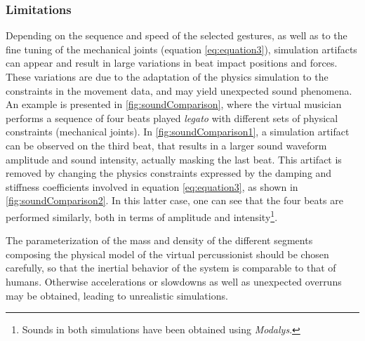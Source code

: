			\subsubsection{Limitations}
			\label{subsubsec:AL_IGS_L}

Depending on the sequence and speed of the selected gestures, as well as to the fine tuning of the mechanical joints (equation \ref{eq:equation3}), simulation artifacts can appear and result in large variations in beat impact positions and forces. These variations are due to the adaptation of the physics simulation to the constraints in the movement data, and may yield unexpected sound phenomena.\\

An example is presented in \myfigname \ref{fig:soundComparison}, where the virtual musician performs a sequence of four beats played \emph{legato} with different sets of physical constraints (mechanical joints). In \myfigname \ref{fig:soundComparison1}, a simulation artifact can be observed on the third beat, that results in a larger sound waveform amplitude and sound intensity, actually masking the last beat. This artifact is removed by changing the physics constraints expressed by the damping and stiffness coefficients involved in equation \ref{eq:equation3}, as shown in \myfigname \ref{fig:soundComparison2}. In this latter case, one can see that the four beats are performed similarly, both in terms of amplitude and intensity\footnote{Sounds in both simulations have been obtained using \emph{Modalys}.}.

The parameterization of the mass and density of the different segments composing the physical model of the virtual percussionist should be chosen carefully, so that the inertial behavior of the system is comparable to that of humans. Otherwise accelerations or slowdowns as well as unexpected overruns may be obtained, leading to unrealistic simulations.

